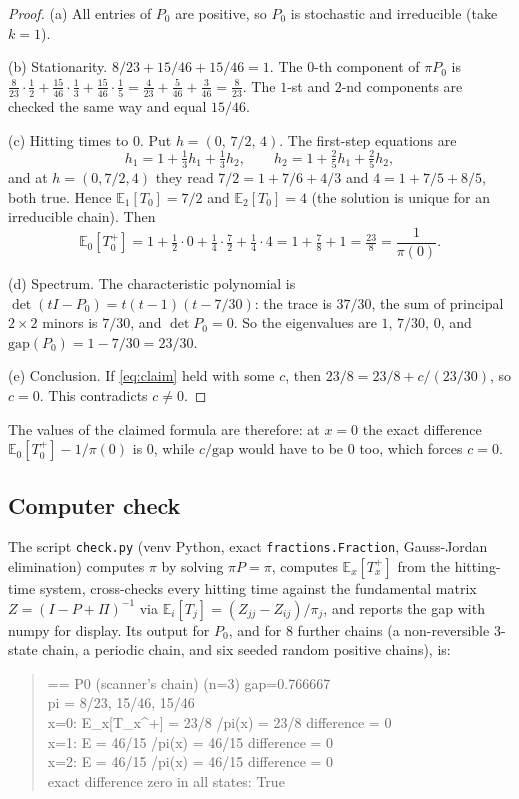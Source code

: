 \documentclass[11pt,a4paper]{article}
\begin{document}
\begin{proof}
(a) All entries of $P_0$ are positive, so $P_0$ is stochastic and irreducible (take $k=1$).

(b) Stationarity. $8/23+15/46+15/46=1$. The $0$-th component of $\pi P_0$ is $\tfrac{8}{23}\cdot\tfrac12+\tfrac{15}{46}\cdot\tfrac13+\tfrac{15}{46}\cdot\tfrac15=\tfrac{4}{23}+\tfrac{5}{46}+\tfrac{3}{46}=\tfrac{8}{23}$. The $1$-st and $2$-nd components are checked the same way and equal $15/46$.

(c) Hitting times to $0$. Put $h=(0,\,7/2,\,4)$. The first-step equations are
\[
h_1=1+\tfrac13 h_1+\tfrac13 h_2,\qquad h_2=1+\tfrac25 h_1+\tfrac25 h_2,
\]
and at $h=(0,7/2,4)$ they read $7/2=1+7/6+4/3$ and $4=1+7/5+8/5$, both true. Hence $\mathbb{E}_1[T_0]=7/2$ and $\mathbb{E}_2[T_0]=4$ (the solution is unique for an irreducible chain). Then
\[
\mathbb{E}_0[T_0^+]=1+\tfrac12\cdot 0+\tfrac14\cdot\tfrac72+\tfrac14\cdot 4=1+\tfrac78+1=\tfrac{23}{8}=\frac{1}{\pi(0)}.
\]

(d) Spectrum. The characteristic polynomial is $\det(tI-P_0)=t(t-1)(t-7/30)$: the trace is $37/30$, the sum of principal $2\times 2$ minors is $7/30$, and $\det P_0=0$. So the eigenvalues are $1,\,7/30,\,0$, and $\mathrm{gap}(P_0)=1-7/30=23/30$.

(e) Conclusion. If \eqref{eq:claim} held with some $c$, then $23/8=23/8+c/(23/30)$, so $c=0$. This contradicts $c\neq 0$.
\end{proof}

\noindent The values of the claimed formula are therefore: at $x=0$ the exact difference $\mathbb{E}_0[T_0^+]-1/\pi(0)$ is $0$, while $c/\mathrm{gap}$ would have to be $0$ too, which forces $c=0$.

\subsection*{Computer check}

The script \texttt{check.py} (venv Python, exact \texttt{fractions.Fraction}, Gauss-Jordan elimination) computes $\pi$ by solving $\pi P=\pi$, computes $\mathbb{E}_x[T_x^+]$ from the hitting-time system, cross-checks every hitting time against the fundamental matrix $Z=(I-P+\Pi)^{-1}$ via $\mathbb{E}_i[T_j]=(Z_{jj}-Z_{ij})/\pi_j$, and reports the gap with numpy for display. Its output for $P_0$, and for 8 further chains (a non-reversible 3-state chain, a periodic chain, and six seeded random positive chains), is:

\begin{quote}\ttfamily\footnotesize
== P0 (scanner's chain) (n=3) gap=0.766667\\
pi = 8/23, 15/46, 15/46\\
x=0: E\_x[T\_x\textasciicircum +] = 23/8 /pi(x) = 23/8 \; difference = 0\\
x=1: E = 46/15 /pi(x) = 46/15 \; difference = 0\\
x=2: E = 46/15 /pi(x) = 46/15 \; difference = 0\\
exact difference zero in all states: True
\end{quote}
\end{document}
